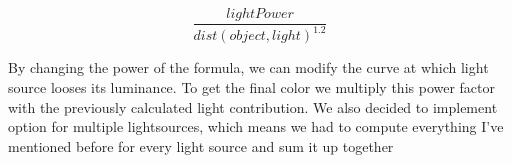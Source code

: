 \documentclass[12pt]{report}
\begin{document}
    \[ 
        \frac{lightPower}{{dist(object, light)}^{1.2}}
    \]
    
    By changing the power of the formula, we can modify the curve at which light source looses its luminance. To get the final color we multiply this power factor with the previously calculated light contribution.
    We also decided to implement option for multiple lightsources, which means we had to compute everything I’ve mentioned before for every light source and sum it up together 
\end{document}
